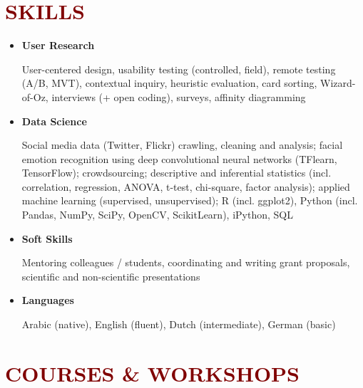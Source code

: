 \documentclass{article}
\begin{document}
\section*{\textcolor{maroon}{\normalsize SKILLS}}

\begin{itemize}[]

\item \textbf{User Research} 

User-centered design, usability testing (controlled, field), remote testing (A/B, MVT), contextual inquiry, heuristic evaluation, card sorting, Wizard-of-Oz, interviews (+ open coding), surveys, affinity diagramming

\item \textbf{Data Science} 

Social media data (Twitter, Flickr) crawling, cleaning and analysis; facial emotion recognition using deep convolutional neural networks (TFlearn, TensorFlow); crowdsourcing; descriptive and inferential statistics (incl. correlation, regression, ANOVA, t-test, chi-square, factor analysis); applied machine learning (supervised, unsupervised); R (incl. ggplot2), Python (incl. Pandas, NumPy, SciPy, OpenCV, ScikitLearn), iPython, SQL

\item \textbf{Soft Skills} 

Mentoring colleagues / students, coordinating and writing grant proposals, scientific and non-scientific presentations 

\item \textbf{Languages} 

Arabic (native), English (fluent), Dutch (intermediate), German (basic)

\end{itemize}



\section*{\textcolor{maroon}{\normalsize COURSES \& WORKSHOPS}}
\end{document}
